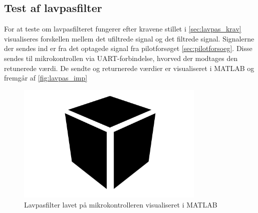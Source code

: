 \subsection{Test af lavpasfilter}
For at teste om lavpasfilteret fungerer efter kravene stillet i \autoref{sec:lavpas_krav} visualiseres forskellen mellem det ufiltrede signal og det filtrede signal. Signalerne der sendes ind er fra det optagede signal fra pilotforsøget \autoref{sec:pilotforsoeg}. Disse sendes til mikrokontrollen via UART-forbindelse, hvorved der modtages den retunerede værdi. De sendte og returnerede værdier er visualiseret i MATLAB og fremgår af \autoref{fig:lavpas_imp}

\begin{figure}[H]
\centering
\includegraphics[width=0.8\textwidth]{figures/Pilotforsoeg/blackbox}
\caption{Lavpasfilter lavet på mikrokontrolleren visualiseret i MATLAB}
\label{fig:lavpas_imp}
\end{figure}


